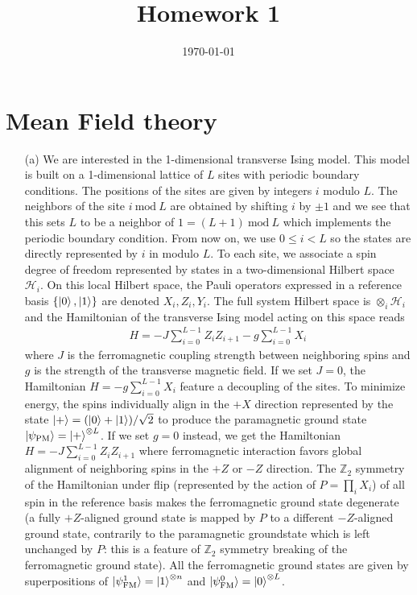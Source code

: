 \documentclass[10pt, a4paper]{article}
\title{Homework 1} %
\author{\PA} %
\date{\today} %
\begin{document}
\maketitlepage

\maketableofcontents


\footnotesize{

\section{Mean Field theory}

\begin{enumerate}
  \item[(a)] We are interested in the 1-dimensional transverse Ising model. This model is built on a 1-dimensional lattice of $L$ sites with periodic boundary conditions. The positions of the sites are given by integers $i$ modulo $L$. The neighbors of the site $i\ \text{mod}\ L$ are obtained by shifting $i$ by $\pm 1$ and we see that this sets $L$ to be a neighbor of $1 = (L+1)\ \text{mod}\ L$ which implements the periodic boundary condition. From now on, we use $0 \leq i < L$ so the states are directly represented by $i$ in modulo $L$. To each site, we associate a spin degree of freedom represented by states in a two-dimensional Hilbert space $\mathcal{H}_i$. On this local Hilbert space, the Pauli operators expressed in a reference basis $\left\{\ket{0}, \ket{1}\right\}$ are denoted $X_i, Z_i, Y_i$. The full system Hilbert space is $\otimes_i \mathcal{H}_i$ and the Hamiltonian of the transverse Ising model acting on this space reads 
  \begin{align*}
    H = - J \sum_{i=0}^{L-1} Z_i Z_{i+1} - g \sum_{i=0}^{L-1} X_i 
  \end{align*} 
  where $J$ is the ferromagnetic coupling strength between neighboring spins and $g$ is the strength of the transverse magnetic field. If we set $J = 0$, the Hamiltonian $H = - g \sum_{i=0}^{L-1} X_i$ feature a decoupling of the sites. To minimize energy, the spins individually align in the $+X$ direction represented by the state $\ket{+} = (\ket{0} + \ket{1})/\sqrt{2}$ to produce the paramagnetic ground state $\ket{\psi_{\text{PM}}} = \ket{+}^{\otimes L}$. If we set $g = 0$ instead, we get the Hamiltonian $H = - J \sum_{i=0}^{L-1} Z_i Z_{i+1}$ where ferromagnetic interaction favors global alignment of neighboring spins in the $+Z$ or $-Z$ direction. The $\mathbb{Z}_2$ symmetry of the Hamiltonian under flip (represented by the action of $P = \prod_i X_i$) of all spin in the reference basis makes the ferromagnetic ground state degenerate (a fully $+Z$-aligned ground state is mapped by $P$ to a different $-Z$-aligned ground state, contrarily to the paramagnetic groundstate which is left unchanged by $P$: this is a feature of $\mathbb{Z}_2$ symmetry breaking of the ferromagnetic ground state). All the ferromagnetic ground states are given by superpositions of $\ket{\psi^1_{\text{FM}}} = \ket{1}^{\otimes n}$ and $\ket{\psi^0_{\text{FM}}} = \ket{0}^{\otimes L}$.\\


\end{enumerate}}
\end{document}
